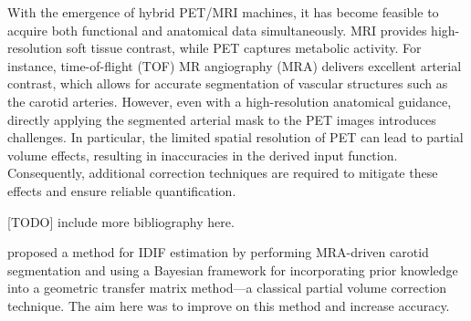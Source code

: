 With the emergence of hybrid PET/MRI machines, it has become feasible to acquire both functional and anatomical data simultaneously.
MRI provides high-resolution soft tissue contrast, while PET captures metabolic activity.
For instance, time-of-flight (TOF) MR angiography (MRA) delivers excellent arterial contrast, which allows for accurate segmentation of vascular structures such as the carotid arteries.
However, even with a high-resolution anatomical guidance, directly applying the segmented arterial mask to the PET images introduces challenges.
In particular, the limited spatial resolution of PET can lead to partial volume effects, resulting in inaccuracies in the derived input function.
Consequently, additional correction techniques are required to mitigate these effects and ensure reliable quantification.


	[TODO] include more bibliography here.


\citeauthor{irace2021bayesian} \cite{irace2021bayesian} proposed a method for IDIF estimation by performing MRA-driven carotid segmentation and using a Bayesian framework for incorporating prior knowledge into a geometric transfer matrix method—a classical partial volume correction technique.
The aim here was to improve on this method and increase accuracy.
